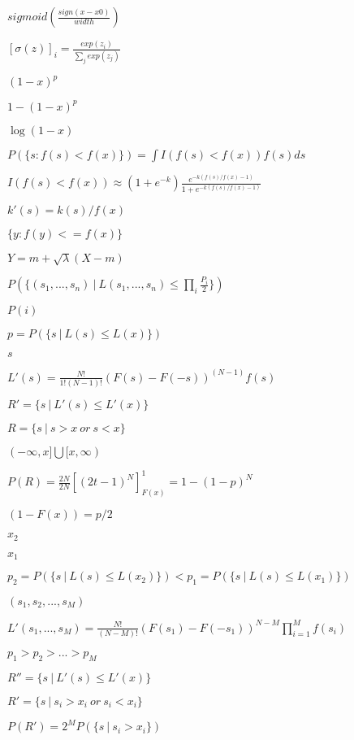\documentclass{article}
\begin{document}
{{{$sigmoid\left(\frac{sign (x - x0)}{width}\right)$
\pagebreak

$[\sigma(z)]_i = \frac{exp(z_i)}{\sum_j exp(z_j)}$
\pagebreak

$(1 - x) ^ p$
\pagebreak

$1 - (1 - x) ^ p$
\pagebreak

$\log(1 - x)$
\pagebreak

$P(\{s : f(s) < f(x)\}) = \int{I(f(s) < f(x)) f(s)}ds$
\pagebreak

$\displaystyle I(f(s) < f(x)) \approx (1+e^{-k}) \frac{e^{-k(f(s)/f(x)-1)}}{1+e^{-k(f(s)/f(x)-1)}}$
\pagebreak

$k'(s) = k(s)/f(x)$
\pagebreak

$\{y : f(y) <= f(x)\}$
\pagebreak

$Y = m + \sqrt{\lambda}(X - m)$
\pagebreak

$P(\{(s_1, ..., s_n)\ |\ L(s_1, ..., s_n) \leq \prod_{i}\frac{P_i}{2}\})$
\pagebreak

$P(i)$
\pagebreak

$ p = P(\{s\ |\ L(s) \leq L(x)\}) $
\pagebreak

$s$
\pagebreak

$ L'(s) = \frac{N!}{1!(N - 1)!} (F(s) - F(-s)) ^{(N-1)} f(s) $
\pagebreak

$ R' = \{s\ |\ L'(s) \leq L'(x)\} $
\pagebreak

$ R = \{s\ |\ s > x\ or\ s < x\} $
\pagebreak

$(-\infty, x] \bigcup [x, \infty)$
\pagebreak

$ P(R) = \frac{2N}{2N} \left[(2t - 1) ^{N}\right]_{F(x)}^1 = 1 - (1 - p) ^{N} $
\pagebreak

$(1 - F(x)) = p / 2$
\pagebreak

$x_2$
\pagebreak

$x_1$
\pagebreak

$ p_2 = P(\{s\ |\ L(s) \leq L(x_2)\}) < p_1 = P(\{s\ |\ L(s) \leq L(x_1)\}) $
\pagebreak

$(s_1, s_2, ..., s_M)$
\pagebreak

$ L'(s_1, ..., s_M) = \frac{N!}{(N-M)!} (F(s_1) - F(-s_1)) ^{N-M} \prod_{i=1}^M f(s_i) $
\pagebreak

$p_1 > p_2 > ...> p_M$
\pagebreak

$ R'' = \{s\ |\ L'(s) \leq L'(x)\} $
\pagebreak

$ R' = \{s\ |\ s_i > x_i\ or\ s_i < x_i\} $
\pagebreak

$ P(R') = 2 ^{M} P(\{s\ |\ s_i > x_i\}) $
\pagebreak

}}}
\end{document}
